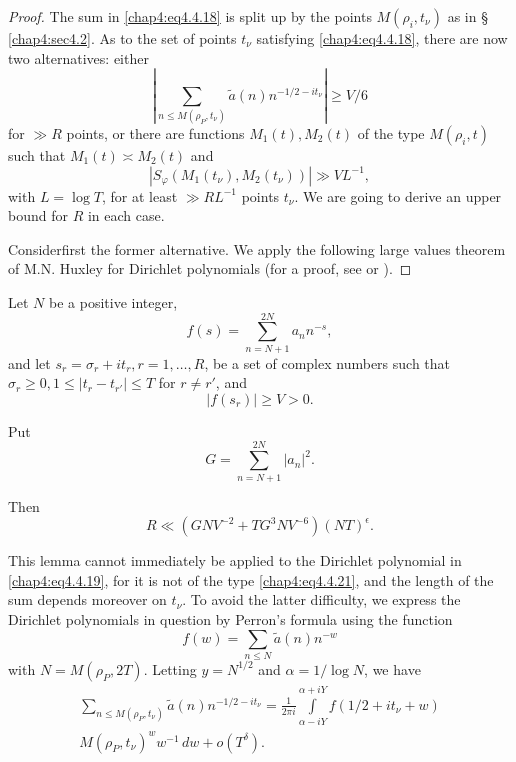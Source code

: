 \begin{proof}
The sum in \eqref{chap4:eq4.4.18} is split up by the points $M(\rho_i,t_\nu)$ as in \S~ \ref{chap4:sec4.2}. As to the set of points $t_\nu$ satisfying \eqref{chap4:eq4.4.18}, there are now two alternatives: either
\begin{equation}\label{chap4:eq4.4.19}
\left|\sum\limits_{n\leq M(\rho_P,t_\nu)}\tilde{a}(n)n^{-1/2-it_\nu}\right|\geq V/6
\end{equation}
for $\gg R$ points, or there are functions $M_1(t),M_2(t)$ of the type $M(\rho_i,t)$ such that $M_1(t)\asymp M_2(t)$ and 
\begin{equation}\label{chap4:eq4.4.20}
\left|S_\varphi\left(M_1(t_\nu),M_2(t_\nu)\right)\right|\gg VL^{-1},
\end{equation}
with $L=\log T$, for at least $\gg RL^{-1}$ points $t_\nu$. We are going to derive an upper bound for $R$ in each case.

Consider\pageoriginale first the former alternative. We apply the following large values theorem of M.N. Huxley for Dirichlet polynomials (for a proof, see \cite{key12} or \cite{key15}).
\end{proof}

\begin{lem}\label{chap4:lem4.3}
Let $N$ be a positive integer,
\begin{equation}\label{chap4:eq4.4.21}
f(s)=\sum\limits_{n=N+1}^{2N}a_n n^{-s},
\end{equation}
and let $s_r=\sigma_r+it_r, r=1,\ldots,R$, be a set of complex numbers such that $\sigma_r\geq 0, 1\leq |t_r-t_{r'} |\leq T$ for $r\neq r'$, and
$$
\left|f(s_r)\right|\geq V>0.
$$

Put
$$
G=\sum\limits_{n=N+1}^{2N}\left|a_n\right|^2.
$$

Then
\begin{equation}\label{chap4:eq4.4.22}
R\ll \left(GNV^{-2}+TG^3NV^{-6}\right)(NT)^\epsilon.
\end{equation}
\end{lem}

This lemma cannot immediately be applied to the Dirichlet polynomial
in \eqref{chap4:eq4.4.19}, for it is not of the type
\eqref{chap4:eq4.4.21}, and the length of the sum depends moreover on
$t_\nu$. To avoid the latter difficulty, we express the Dirichlet
polynomials in question by Perron's formula using the function 
$$
f(w)=\sum\limits_{n\leq N}\tilde{a}(n)n^{-w}
$$
with $N=M(\rho_P,2T)$. Letting $y=N^{1/2}$ and $\alpha=1/\log N$, we have 
\begin{multline*}
\sum\limits_{n\leq
  M(\rho_P,t_\nu)}\tilde{a}(n)n^{-1/2-it_\nu}=\frac{1}{2\pi i}
\int\limits_{\alpha-iY}^{\alpha+iY}f\left(1/2+it_\nu+w\right)\\ 
M \left(\rho_P,t_\nu\right)^w w^{-1}\,dw + o\left(T^\delta\right). 
\end{multline*}

